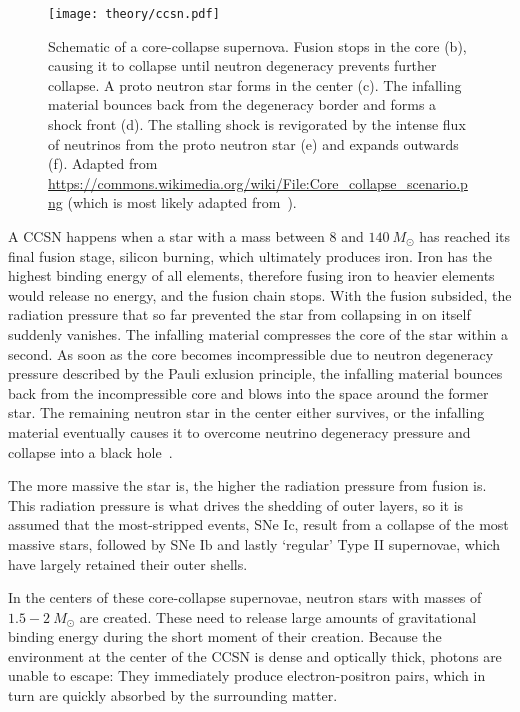 \begin{figure}[htb]
    \texttt{[image: theory/ccsn.pdf]}
    \caption[Core-collapse supernova]{Schematic of a core-collapse supernova. Fusion stops in the core (b), causing it to collapse until neutron degeneracy prevents further collapse. A proto neutron star forms in the center (c). The infalling material bounces back from the degeneracy border and forms a shock front (d). The stalling shock is revigorated by the intense flux of neutrinos from the proto neutron star (e) and expands outwards (f). Adapted from \url{https://commons.wikimedia.org/wiki/File:Core_collapse_scenario.png} (which is most likely adapted from~\cite{Janka2012}).}
\end{figure}

A CCSN happens when a star with a mass between $8$ and $140~M_\odot$ has reached its final fusion stage, silicon burning, which ultimately produces iron. Iron has the highest binding energy of all elements, therefore fusing iron to heavier elements would release no energy, and the fusion chain stops. With the fusion subsided, the radiation pressure that so far prevented the star from collapsing in on itself suddenly vanishes. The infalling material compresses the core of the star within a second. As soon as the core becomes incompressible due to neutron degeneracy pressure described by the Pauli exlusion principle, the infalling material bounces back from the incompressible core and blows into the space around the former star. The remaining neutron star in the center either survives, or the infalling material eventually causes it to overcome neutrino degeneracy pressure and collapse into a black hole~\cite{Alsabti2017}.

The more massive the star is, the higher the radiation pressure from fusion is. This radiation pressure is what drives the shedding of outer layers, so it is assumed that the most-stripped events, SNe Ic, result from a collapse of the most massive stars, followed by SNe Ib and lastly `regular' Type II supernovae, which have largely retained their outer shells.

In the centers of these core-collapse supernovae, neutron stars with masses of $1.5-2~M_\odot$ are created. These need to release large amounts of gravitational binding energy during the short moment of their creation. Because the environment at the center of the CCSN is dense and optically thick, photons are unable to escape: They immediately produce electron-positron pairs, which in turn are quickly absorbed by the surrounding matter.

